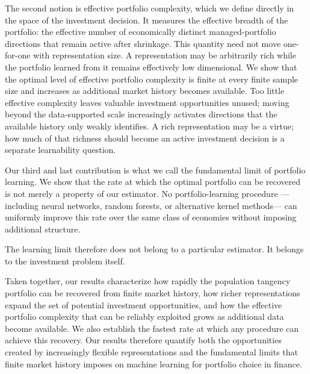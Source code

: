 The second notion is effective portfolio complexity, which we define directly in the space of the investment decision. It measures the effective breadth of the portfolio: the effective number of economically distinct managed-portfolio directions that remain active after shrinkage.
This quantity need not move one-for-one with representation size. A representation may be arbitrarily rich while the portfolio learned from it remains effectively low dimensional. We show that the optimal level of effective portfolio complexity is finite at every finite sample size and increases as additional market history becomes available. Too little effective complexity leaves valuable investment opportunities unused; moving beyond the data-supported scale increasingly activates directions that the available history only weakly identifies. A rich representation may be a virtue; how much of that richness should become an active investment decision is a separate learnability question.


Our third and last contribution is what we call the fundamental limit of portfolio
learning. We show that the rate at which the optimal portfolio can be recovered is not merely a property of our estimator. 
No portfolio-learning procedure —including neural networks, random forests, or alternative kernel methods— can uniformly improve this rate over the same class of economies without imposing additional structure.

The learning limit therefore does not belong to a particular estimator. It
belongs to the investment problem itself.

Taken together, our results characterize how rapidly the population tangency portfolio can be recovered from finite market history, how richer representations expand the set of potential investment opportunities, and how the effective portfolio complexity that can be reliably exploited grows as additional data become available. We also establish the fastest rate at which any procedure can achieve this recovery. Our results therefore quantify both the opportunities created by increasingly flexible representations and the fundamental limits that finite market history imposes on machine learning for portfolio choice in finance.